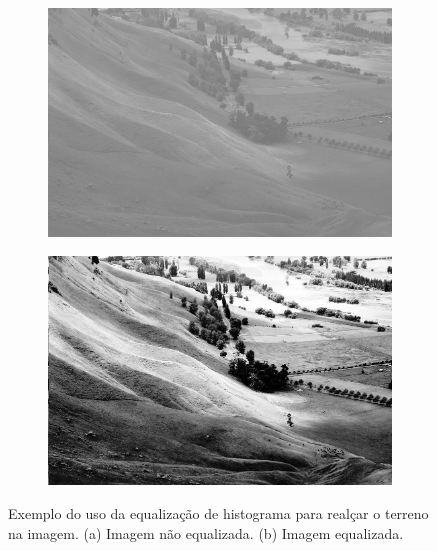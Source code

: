 \begin{figure}[H]
    \centering
    \begin{subfigure}[t]{0.3\textwidth}
      \includegraphics[width=\textwidth]{figuras/Unequalized.jpg}
      \label{fig:unequalizedImage}
    \end{subfigure}
    \begin{subfigure}[t]{0.3\textwidth}
      \includegraphics[width=\textwidth]{figuras/Equalized.jpg}
      \label{fig:equalizedImage}
    \end{subfigure}
    \caption{Exemplo do uso da equalização de histograma para realçar o terreno
            na imagem. (a) Imagem não equalizada. (b) Imagem equalizada.}
    \label{fig:equalization}
\end{figure}


